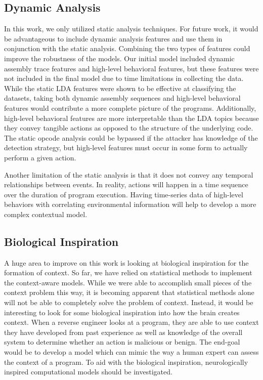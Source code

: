 \documentclass[../stegner_thesis.tex]{subfiles}
\begin{document}
\subsection{Dynamic Analysis}%
\label{sec:concl_dynamic}

\par In this work, we only utilized static analysis techniques.
For future work, it would be advantageous to include dynamic analysis features
and use them in conjunction with the static analysis.
Combining the two types of features could improve the robustness of the models.
Our initial model included dynamic assembly trace features and high-level
behavioral features, but these features were not included in the final model
due to time limitations in collecting the data.
While the static LDA features were shown to be effective at classifying the
datasets, taking both dynamic assembly sequences and high-level behavioral
features would contribute a more complete picture of the programs.
Additionally, high-level behavioral features are more interpretable than
the LDA topics because they convey tangible actions as opposed to the structure
of the underlying code.
The static opcode analysis could be bypassed if the attacker has knowledge of
the detection strategy, but high-level features must occur in some form to
actually perform a given action.

\par Another limitation of the static analysis is that it does not convey any
temporal relationships between events.
In reality, actions will happen in a time sequence over the duration of program
execution.
Having time-series data of high-level behaviors with correlating environmental
information will help to develop a more complex contextual model.

\subsection{Biological Inspiration}%
\label{sec:concl_biological}

\par A huge area to improve on this work is looking at biological inspiration
for the formation of context.
So far, we have relied on statistical methods to implement the context-aware
models.
While we were able to accomplish small pieces of the context problem this way,
it is becoming apparent that statistical methods alone will not be able to
completely solve the problem of context.
Instead, it would be interesting to look for some biological inspiration into
how the brain creates context.
When a reverse engineer looks at a program, they are able to use context they
have developed from past experience as well as knowledge of the overall  system
to determine whether an action is malicious or benign.
The end-goal would be to develop a model which can mimic the way a human expert
can assess the context of a program.
To aid with the biological inspiration, neurologically inspired computational
models should be investigated.
\end{document}
